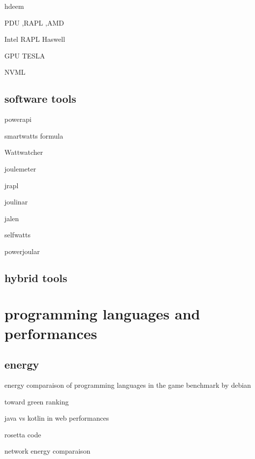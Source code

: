 hdeem \cite{hackenberg2014hdeem}

PDU ,RAPL ,AMD \cite{hackenberg2013power}

Intel RAPL Haswell \cite{hackenberg2015energy}

GPU TESLA \cite{burtscher2014measuring}

NVML\cite{fahad2019comparative}


\subsection{software tools}

powerapi \cite{colmant2018next}

smartwatts formula \cite{fieni2020smartwatts}

Wattwatcher \cite{lebeane2015watt}

joulemeter \cite{kothari2009joulemeter}\cite{jagroep2017energy}

jrapl \cite{guimaraes2016some} \cite{liu2015data}

joulinar \cite{islam2016measuring} \cite{noureddine2016jolinar}

jalen \cite{noureddine2015monitoring}

selfwatts \cite{fieni2021selfwatts}

powerjoular \cite{noureddine2022powerjoular}
\subsection{hybrid tools}


\section{programming languages and performances}
\subsection{energy}


energy comparaison of programming languages in the game benchmark by debian \cite{pereira2017energy}

toward green ranking \cite{couto2017towards}

java vs kotlin in web performances \cite{bujnowski2020java}

rosetta code \cite{nanz2015comparative} \cite{mirowski2020rosetta}

network energy comparaison \cite{balasubramanian2009energy}

